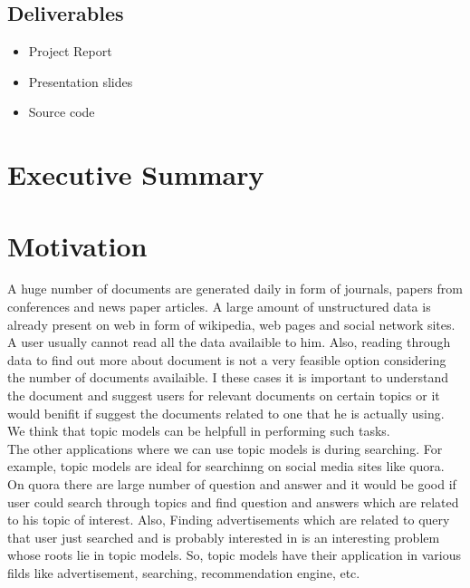 \documentclass[a4paper,11pt]{article}
\begin{document}
\subsection{Deliverables}
\begin{itemize}
\item Project Report
\item Presentation slides
\item Source code
\end{itemize}


\section{Executive Summary}


\section{Motivation}


A huge number of documents are generated daily in form of journals, papers from conferences and  news paper articles. A large amount of unstructured data is already present on web in form of wikipedia, web pages and social network sites. A user usually cannot read all the data availaible to him. Also, reading through data to find out more about document is not a very feasible option considering the number of documents availaible. I these cases it is important to understand the document and suggest users for relevant documents on certain topics or it would benifit if suggest the documents related to one that he is actually using. We think that topic models can be helpfull in performing such tasks. \\

The other applications where we can use topic models is during searching. For example, topic models are ideal for searchinng on social media sites like quora. On quora there are large number of question and answer and it would be good if user could search through topics and find question and answers which are related to his topic of interest. Also, Finding advertisements which are related to query that user just searched and is probably interested in is an interesting problem whose roots lie in topic models. So, topic models have their application in various filds like advertisement, searching, recommendation engine, etc. \\
\end{document}
